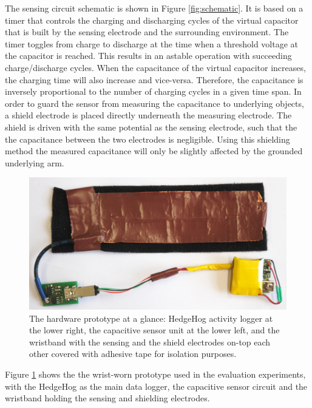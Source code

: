 \documentclass[runningheads,a4paper]{llncs}
\begin{document}
The sensing circuit schematic is shown in Figure \ref{fig:schematic}. It is based on a timer that controls the charging and discharging cycles of the virtual capacitor that is built by the sensing electrode and the surrounding environment. The timer toggles from charge to discharge at the time when a threshold voltage at the capacitor is reached. This results in an astable operation with succeeding charge/discharge cycles. When the capacitance of the virtual capacitor increases, the charging time will also increase and vice-versa. Therefore, the capacitance is inversely proportional to the number of charging cycles in a given time span. In order to guard the sensor from measuring the capacitance to underlying objects, a shield electrode is placed directly underneath the measuring electrode. The shield is driven with the same potential as the sensing electrode, such that the the capacitance between the two electrodes is negligible. Using this shielding method the measured capacitance will only be slightly affected by the grounded underlying arm.

\begin{figure}
	\centering
		\includegraphics[width=1.00\textwidth]{Images/capacitive_sensor_wristband_2.jpg}
	\caption{The hardware prototype at a glance: HedgeHog activity logger at the lower right, the capacitive sensor unit at the lower left, and the wristband with the sensing and the shield electrodes on-top each other covered with adhesive tape for isolation purposes.}
	\label{fig:cap_sensor}
\end{figure}

Figure \ref{fig:cap_sensor} shows the the wrist-worn prototype used in the evaluation experiments, with the HedgeHog as the main data logger, the capacitive sensor circuit and the wristband holding the sensing and shielding electrodes.
\end{document}
